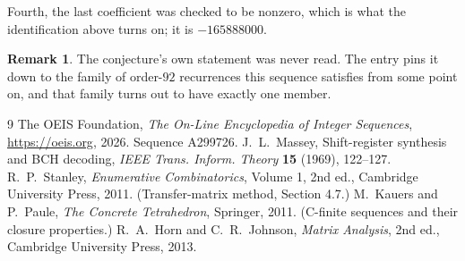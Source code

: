 \documentclass[11pt,a4paper]{article}
\theoremstyle{plain}
\theoremstyle{definition}
\newtheorem{remark}[theorem]{Remark}
\begin{document}
Fourth, the last coefficient was checked to be nonzero, which is what the identification above
turns on; it is $-165888000$.

\begin{remark}
The conjecture's own statement was never read. The entry pins it down to the family of
order-$92$ recurrences this sequence satisfies from some point on, and that family turns
out to have exactly one member.
\end{remark}

\begin{thebibliography}{9}
 The OEIS Foundation, \emph{The On-Line Encyclopedia of Integer
Sequences}, \url{https://oeis.org}, 2026. Sequence A299726.
 J.~L.~Massey, Shift-register synthesis and BCH decoding, \emph{IEEE
Trans. Inform. Theory} \textbf{15} (1969), 122--127.
 R.~P.~Stanley, \emph{Enumerative Combinatorics}, Volume 1, 2nd ed.,
Cambridge University Press, 2011. (Transfer-matrix method, Section 4.7.)
 M.~Kauers and P.~Paule, \emph{The Concrete Tetrahedron}, Springer, 2011.
(C-finite sequences and their closure properties.)
 R.~A.~Horn and C.~R.~Johnson, \emph{Matrix Analysis}, 2nd ed., Cambridge
University Press, 2013.
\end{thebibliography}
\end{document}
